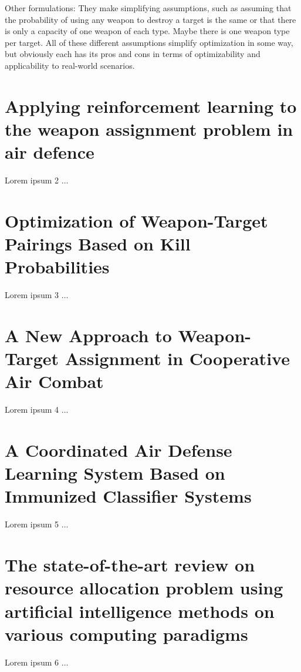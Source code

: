 \documentclass[12pt]{article} %
\begin{document}
Other formulations:
They make simplifying assumptions, such as assuming that the probability of using any weapon
to destroy a target is the same or that there is only a capacity of one weapon of each type. Maybe there is 
one weapon type per target. All of these different assumptions simplify optimization in some way, but obviously
each has its pros and cons in terms of optimizability and applicability to real-world scenarios.  


\section*{Applying reinforcement learning to the weapon assignment problem in air defence \cite{rl_wa_airDefence_mouton_2011}}
Lorem ipsum 2 $\ldots$


\section*{Optimization of Weapon-Target Pairings Based on Kill Probabilities \cite{killProbs_bogdanowicz_2013}}
Lorem ipsum 3 $\ldots$


\section*{A New Approach to Weapon-Target Assignment in Cooperative Air Combat \cite{swarmHarmony_chang_2017}}
Lorem ipsum 4 $\ldots$


\section*{A Coordinated Air Defense Learning System Based on Immunized Classifier Systems \cite{immunized_nantogma_2021}}
Lorem ipsum 5 $\ldots$


\section*{The state-of-the-art review on resource allocation problem using artificial intelligence methods on various computing paradigms \cite{resourceAlloc_joloudari_2022}}
Lorem ipsum 6 $\ldots$




\end{document}
